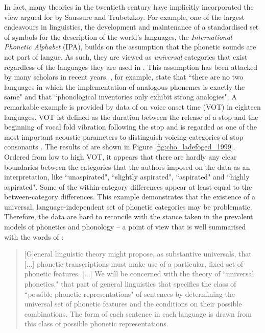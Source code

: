 In fact, many theories in the twentieth century have implicitly incorporated the view argued for by Saussure and Trubetzkoy. For example, one of the largest endeavours in linguistics, the development and maintenance of a standardised set of symbols for the description of the world's languages, the \emph{International Phonetic Alphabet} (IPA), builds on the assumption that the phonetic sounds are not part of langue. As such, they are viewed as \emph{universal} categories that exist regardless of the languages they are used in \citep{IPA1999,Ladd2014}. This assumption has been attacked by many scholars in recent years. \citet[30f]{Pierrehumbertetal2000}, for example, state that ``there are no two languages in which the implementation of analogous phonemes is exactly the same" and that ``phonological inventories only exhibit strong analogies". A remarkable example is provided by data of \cite{ChoLadefoged1999} on voice onset time (VOT) in eighteen languages. VOT ist defined as the duration between the release of a stop and the beginning of vocal fold vibration following the stop and is regarded as one of the most important acoustic parameters to distinguish voicing categories of stop consonants \citep{Lisker1986}. The results of \cite{ChoLadefoged1999} are shown in Figure \ref{fig:cho_ladefoged_1999}. Ordered from low to high VOT, it appears that there are hardly any clear boundaries between the categories that the authors imposed on the data as an interpretation, like ``unaspirated", ``slightly aspirated", ``aspirated" and ``highly aspirated". Some of the within-category differences appear at least equal to the between-category differences. This example demonstrates that the existence of a universal, language-independent set of phonetic categories may be problematic. Therefore, the data are hard to reconcile with the stance taken in the prevalent models of phonetics and phonology -- a point of view that is well summarised with the words of \citet[4f]{ChomskyHalle1968}:

\begin{quote}
[G]eneral linguistic theory might propose, as substantive universals, that [...] phonetic transcriptions must make use of a particular, fixed set of phonetic features. [...] We will be concerned with the theory of ``universal phonetics," that part of general linguistics that specifies the class of ``possible phonetic representations" of sentences by determining the universal set of phonetic features and the conditions on their possible combinations. The form of each sentence in each language is drawn from this class of possible phonetic representations.
\end{quote}

